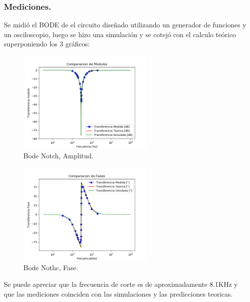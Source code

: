 \documentclass[a4paper]{article}
\begin{document}
\subsubsection{Mediciones.}
Se midió el BODE de el circuito diseñado utilizando un generador de funciones y un osciloscopio, luego se hizo una simulación y se cotejó con el calculo teórico superponiendo los 3 gráficos:
\begin{figure}[H]
	\centering
	\includegraphics[width=0.6\textwidth, trim={0 0.1cm  0 0},clip]{BodeNotchAmp.png}
\caption{Bode Notch, Amplitud.}
	\label{fig:BodeNotchAmp}
\end{figure}
\begin{figure}[H]
	\centering
	\includegraphics[width=0.6\textwidth, trim={0 0.1cm  0 0},clip]{BodeNotchPhase.png}
\caption{Bode Nothc, Fase.}
	\label{fig:BodeNotchPhase}
\end{figure}
Se puede apreciar que la frecuencia de corte es de aproximadamente 8.1KHz y que las mediciones coinciden con las simulaciones y las predicciones teoricas.
\end{document}
